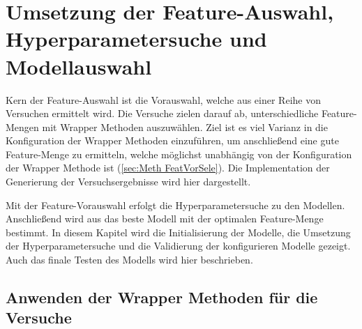 \section{Umsetzung der Feature-Auswahl, Hyperparametersuche und Modellauswahl} \label{sec:umsetz FeatSelec}
Kern der Feature-Auswahl ist die Vorauswahl, welche aus einer Reihe von Versuchen ermittelt wird. Die Versuche zielen darauf ab, unterschiedliche Feature-Mengen mit Wrapper Methoden auszuwählen. Ziel ist es viel Varianz in die Konfiguration der Wrapper Methoden einzuführen, um anschließend eine gute Feature-Menge zu ermitteln, welche möglichst unabhängig von der Konfiguration der Wrapper Methode ist (\autoref{sec:Meth FeatVorSele}). Die Implementation der Generierung der Versuchsergebnisse wird hier dargestellt. \par

Mit der Feature-Vorauswahl erfolgt die Hyperparametersuche zu den Modellen. Anschließend wird aus das beste Modell mit der optimalen Feature-Menge bestimmt. In diesem Kapitel wird die Initialisierung der Modelle, die Umsetzung der Hyperparametersuche und die Validierung der konfigurieren Modelle gezeigt. Auch das finale Testen des Modells wird hier beschrieben. 

\subsection{Anwenden der Wrapper Methoden für die Versuche}

